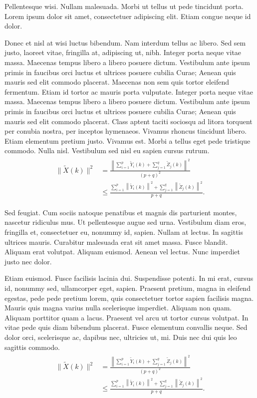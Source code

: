 \documentclass[ASNA,twocolumn]{USG} %
\begin{document}
Pellentesque wisi. Nullam malesuada. Morbi ut tellus ut pede tincidunt porta. Lorem ipsum dolor sit amet,
consectetuer adipiscing elit. Etiam congue neque id dolor.

Donec et nisl at wisi luctus bibendum. Nam interdum tellus ac libero. Sed sem justo, laoreet vitae, fringilla at,
adipiscing ut, nibh. Integer porta neque vitae massa. Maecenas tempus libero a libero posuere dictum. Vestibulum ante ipsum primis in
faucibus orci luctus et ultrices posuere cubilia Curae; Aenean quis mauris sed elit commodo placerat.
Maecenas non sem quis tortor eleifend fermentum. Etiam id tortor ac mauris porta vulputate.
Integer porta neque vitae massa. Maecenas tempus libero a libero posuere dictum. Vestibulum ante ipsum primis in
faucibus orci luctus et ultrices posuere cubilia Curae; Aenean quis mauris sed elit commodo placerat. Class aptent
taciti sociosqu ad litora torquent per conubia nostra, per inceptos hymenaeos. Vivamus rhoncus tincidunt libero.
Etiam elementum pretium justo. Vivamus est. Morbi a tellus eget pede tristique commodo. Nulla nisl. Vestibulum
sed nisl eu sapien cursus rutrum.
\begin{align}\label{eq23}
\begin{split}
 \|\tilde{X}(k)\|^2
 &=\frac{\left\|\sum\limits_{i=1}^{p}\tilde{Y}_i(k)+\sum\limits_{j=1}^{q}\tilde{Z}_j(k) \right\|^2}{(p+q)^2} \\
& \leq\frac{\sum\limits_{i=1}^{p}\left\|\tilde{Y}_i(k)\right\|^2+\sum\limits_{j=1}^{q}\left\|\tilde{Z}_j(k)\right\|^2 }{p+q}.
\end{split}
\end{align}

Sed feugiat. Cum sociis natoque penatibus et magnis dis parturient montes, nascetur ridiculus mus. Ut pellentesque
augue sed urna. Vestibulum diam eros, fringilla et, consectetuer eu, nonummy id, sapien. Nullam at lectus. In sagittis
ultrices mauris. Curabitur malesuada erat sit amet massa. Fusce blandit. Aliquam erat volutpat. Aliquam euismod.
Aenean vel lectus. Nunc imperdiet justo nec dolor.

Etiam euismod. Fusce facilisis lacinia dui. Suspendisse potenti. In mi erat, cursus id, nonummy sed, ullamcorper
eget, sapien. Praesent pretium, magna in eleifend egestas, pede pede pretium lorem, quis consectetuer tortor sapien
facilisis magna. Mauris quis magna varius nulla scelerisque imperdiet. Aliquam non quam. Aliquam porttitor quam
a lacus. Praesent vel arcu ut tortor cursus volutpat. In vitae pede quis diam bibendum placerat. Fusce elementum
convallis neque. Sed dolor orci, scelerisque ac, dapibus nec, ultricies ut, mi. Duis nec dui quis leo sagittis commodo.
\begin{align}\label{eq24}
\begin{split}
 \|\tilde{X}(k)\|^2
 &=\frac{\left\|\sum\limits_{i=1}^{p}\tilde{Y}_i(k)+\sum\limits_{j=1}^{q}\tilde{Z}_j(k) \right\|^2}{(p+q)^2} \\
& \leq\frac{\sum\limits_{i=1}^{p}\left\|\tilde{Y}_i(k)\right\|^2+\sum\limits_{j=1}^{q}\left\|\tilde{Z}_j(k)\right\|^2 }{p+q}.
\end{split}
\end{align}
\end{document}

